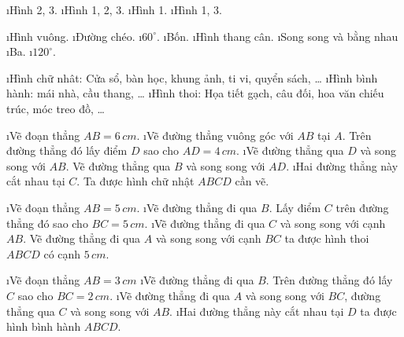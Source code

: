 \begin{Answer}{74}
		\begin{enumerate}[a), leftmargin=*]
			\i Hình 2, 3.
			\i Hình 1, 2, 3.
			\i Hình 1.
			\i Hình 1, 3.
		\end{enumerate}
	
\end{Answer}
\begin{Answer}{75}
		\begin{enumerate}[a), leftmargin=*]
			\i Hình vuông.
			\i Đường chéo.
			\i  $60^\circ$.
			\i Bốn.
			\i Hình thang cân.
			\i Song song và bằng nhau
			\i Ba.
			\i  $120^\circ$.
		\end{enumerate}
	
\end{Answer}
\begin{Answer}{76}
		\begin{enumerate}[--, leftmargin=*]
			\i Hình chữ nhât: Cửa sổ, bàn học, khung ảnh, ti vi, quyển sách, \ldots
			\i Hình bình hành: mái nhà, cầu thang, \ldots
			\i Hình thoi: Họa tiết gạch, câu đối, hoa văn chiếu trúc, móc treo đồ, \ldots
		\end{enumerate}
	
\end{Answer}
\begin{Answer}{77}
		\begin{enumerate}[Bước 1:, leftmargin=*]
			\i Vẽ đoạn thẳng $AB = 6\, cm$.
			\i Vẽ đường thẳng vuông góc với $AB$ tại  $A$. Trên đường thẳng đó lấy điểm $D$ sao cho $AD = 4\, cm$.
			\i Vẽ đường thẳng qua $D$ và song song với $AB$. Vẽ đường thẳng qua $B$ và song song với $AD$.
			\i Hai đường thẳng này cắt nhau tại $C$. Ta được hình chữ nhật $ABCD$ cần vẽ.
		\end{enumerate}
	
\end{Answer}
\begin{Answer}{78}
		\begin{enumerate}[Bước 1:, leftmargin=*]
			\i Vẽ đoạn thẳng $AB = 5\,cm$.
			\i Vẽ đường thẳng đi qua $B$. Lấy điểm $C$  trên đường thẳng đó sao cho $BC = 5\,cm$.
			\i Vẽ đường thẳng đi qua $C$ và song song với cạnh $AB$. Vẽ đường thẳng đi qua $A$ và song song với cạnh $BC$ ta được hình thoi $ABCD$ có cạnh $5\,cm$.
		\end{enumerate}
	
\end{Answer}
\begin{Answer}{79}
		\begin{enumerate}[Bước 1:, leftmargin=*]
			\i Vẽ đoạn thẳng $AB = 3\,cm$
			\i Vẽ đường thẳng đi qua $B$. Trên đường thẳng đó lấy $C$ sao cho $BC= 2\,cm$.
			\i Vẽ đường thẳng đi qua $A$ và song song với  $BC$, đường thẳng qua $C$  và song song với $AB$.
			\i Hai đường thẳng này cắt nhau tại  $D$ ta được hình bình hành $ABCD$.
		\end{enumerate}
	
\end{Answer}

